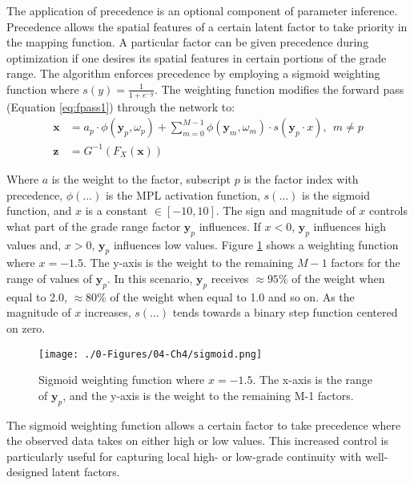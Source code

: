The application of precedence is an optional component of parameter inference. Precedence allows the spatial features of a certain latent factor to take priority in the mapping function. A particular factor can be given precedence during optimization if one desires its spatial features in certain portions of the grade range. The algorithm enforces precedence by employing a sigmoid weighting function where $s(y) = \frac{1}{1+e^{-y}}$. The weighting function modifies the forward pass (Equation \ref{eq:fpass1}) through the network to:
\begin{align}
    \label{eq:wtpass1}
    \mathbf{x} & = a_{p} \cdot \phi(\mathbf{y}_{p}, \omega_{p}) + \sum_{m=0}^{M-1} \phi(\mathbf{y}_{m}, \omega_{m}) \cdot s(\mathbf{y}_{p} \cdot x), \ \ m \neq p \\
    \label{eq:wtpass2}
    \mathbf{z} & = G^{-1}\left( F_{X}\left(\mathbf{x} \right)\right)
\end{align}

Where $a$ is the weight to the factor, subscript $p$ is the factor index with precedence, $\phi(\dots)$ is the \gls{MPL} activation function, $s(\dots)$ is the sigmoid function, and $x$ is a constant $\in [-10, 10]$. The sign and magnitude of $x$ controls what part of the grade range factor $\mathbf{y}_{p}$ influences. If $x<0$, $\mathbf{y}_{p}$ influences high values and, $x>0$, $\mathbf{y}_{p}$ influences low values. Figure \ref{fig:sigmoid} shows a weighting function where $x=-1.5$. The y-axis is the weight to the remaining $M-1$ factors for the range of values of $\mathbf{y}_{p}$. In this scenario, $\mathbf{y}_{p}$ receives $\approx 95\%$ of the weight when equal to 2.0, $\approx 80\%$ of the weight when equal to 1.0 and so on. As the magnitude of $x$ increases, $s(\dots)$ tends towards a binary step function centered on zero.

\begin{figure}[htb!]
    \centering
    \texttt{[image: ./0-Figures/04-Ch4/sigmoid.png]}
    \caption{Sigmoid weighting function where $x=-1.5$. The x-axis is the range of $\mathbf{y}_{p}$, and the y-axis is the weight to the remaining M-1 factors. }
    \label{fig:sigmoid}
\end{figure}

The sigmoid weighting function allows a certain factor to take precedence where the observed data takes on either high or low values. This increased control is particularly useful for capturing local high- or low-grade continuity with well-designed latent factors.

